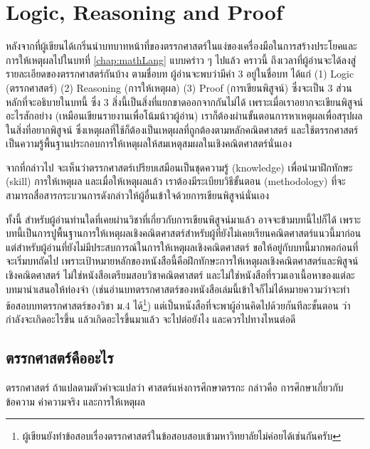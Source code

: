 \chapter{Logic, Reasoning and Proof}

หลังจากที่ผู้เขียนได้เกริ่นนำบทบาทหน้าที่ของตรรกศาสตร์ในแง่ของเครื่องมือในการสร้างประโยคและการให้เหตุผลไปในบทที่ \ref{chap:mathLang} แบบคร่าว ๆ ไปแล้ว
คราวนี้ ถึงเวลาที่ผู้อ่านจะได้ลงสู่รายละเอียดของตรรกศาสตร์กันบ้าง
ตามชื่อบท ผู้อ่านจะพบว่ามีคำ 3 อยู่ในชื่อบท ได้แก่ (1) Logic (ตรรกศาสตร์) (2) Reasoning (การให้เหตุผล) (3) Proof (การเขียนพิสูจน์) ซึ่งจะเป็น 3 ส่วนหลักที่จะอธิบายในบทนี้ ซึ่ง 3 สิ่งนี้เป็นสิ่งที่แยกขาดออกจากกันไม่ได้ เพราะเมื่อเราอยากจะเขียนพิสูจน์อะไรสักอย่าง (เหมือนเขียนรายงานเพื่อโน้มน้าวผู้อ่าน) เราก็ต้องผ่านขั้นตอนการหาเหตุผลเพื่อสรุปผลในสิ่งที่อยากพิสูจน์ ซึ่งเหตุผลที่ใช้ก็ต้องเป็นเหตุผลที่ถูกต้องตามหลักคณิตศาสตร์ และใช้ตรรกศาสตร์เป็นความรู้พื้นฐานประกอบการให้เหตุผลให้สมเหตุสมผลในเชิงคณิตศาสตร์นั่นเอง

จากที่กล่าวไป จะเห็นว่าตรรกศาสตร์เปรียบเสมือนเป็นชุดความรู้ (knowledge) เพื่อนำมาฝึกทักษะ (skill) การให้เหตุผล และเมื่อให้เหตุผลแล้ว เราต้องมีระเบียบวิธีขั้นตอน (methodology) ที่จะสามารถสื่อสารกระบวนการดังกล่าวให้ผู้อื่นเข้าใจด้วยการเขียนพิสูจน์นั่นเอง

ทั้งนี้ สำหรับผู้อ่านท่านใดที่เคยผ่านวิชาที่เกี่ยวกับการเขียนพิสูจน์มาแล้ว อาจจะข้ามบทนี้ไปก็ได้ เพราะบทนี้เป็นการปูพื้นฐานการให้เหตุผลเชิงคณิตศาสตร์สำหรับผู้ที่ยังไม่เคยเรียนคณิตศาสตร์แนวนี้มาก่อน
แต่สำหรับผู้อ่านที่ยังไม่มีประสบการณ์ในการให้เหตุผลเชิงคณิตศาสตร์ ขอให้อยู่กับบทนี้มากพอก่อนที่จะเริ่มบทถัดไป เพราะเป้าหมายหลักของหนังสือนี้คือฝึกทักษะการให้เหตุผลเชิงคณิตศาสตร์และพิสูจน์เชิงคณิตศาสตร์ ไม่ใช่หนังสือเตรียมสอบวิชาคณิตศาสตร์ และไม่ใช่หนังสือที่รวมเอาเนื้อหาของแต่ละบทมานำเสนอให้ท่องจำ (เช่นอ่านบทตรรกศาสตร์ของหนังสือเล่มนี้เข้าใจก็ไม่ได้หมายความว่าจะทำข้อสอบบทตรรกศาสตร์ของวิชา ม.4 ได้\footnote{ผู้เขียนยังทำข้อสอบเรื่องตรรกศาสตร์ในข้อสอบสอบเข้ามหาวิทยาลัยไม่ค่อยได้เช่นกันครับ}) แต่เป็นหนังสือที่จะพาผู้อ่านคิดไปด้วยกันทีละขั้นตอน ว่ากำลังจะเกิดอะไรขึ้น แล้วเกิดอะไรขึ้นมาแล้ว จะไปต่อยังไง และควรไปทางไหนต่อดี

\section{ตรรกศาสตร์คืออะไร}

ตรรกศาสตร์ ถ้าแปลตามตัวคำจะแปลว่า ศาสตร์แห่งการศึกษาตรรกะ กล่าวคือ การศึกษาเกี่ยวกับข้อความ ค่าความจริง และการให้เหตุผล



